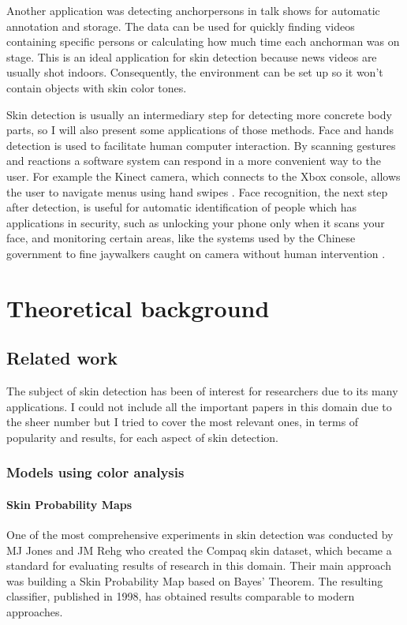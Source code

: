 \documentclass[12pt]{report}
\begin{document}
	Another application was detecting anchorpersons in talk shows \cite{anchor_person_detection} for automatic annotation and storage. The data can be used for quickly finding videos containing specific persons or calculating how much time each anchorman was on stage. This is an ideal application for skin detection because news videos are usually shot indoors. Consequently, the environment can be set up so it won't contain objects with skin color tones.
	
	Skin detection is usually an intermediary step for detecting more concrete body parts, so I will also present some applications of those methods. Face and hands detection is used to facilitate human computer interaction. By scanning gestures and reactions a software system can respond in a more convenient way to the user. For example the Kinect camera, which connects to the Xbox console,
	allows the user to navigate menus using hand swipes \cite{kinect_control}. Face recognition, the next step after detection, is useful for automatic identification of people \cite{detecting_faces_a_survey} which has applications in security, such as unlocking your phone only when it scans your face, and monitoring certain areas, like the systems used by the Chinese government to fine jaywalkers caught on camera without human intervention \cite{jaywalkers_china}.
	
	\chapter{Theoretical background}
	
	\section{Related work}
	The subject of skin detection has been of interest for researchers due to its many applications. I could not include all the important papers in this domain due to the sheer number but I tried to cover the most relevant ones, in terms of popularity and results, for each aspect of skin detection.
	
	\subsection{Models using color analysis}
	
	\subsubsection{Skin Probability Maps}
	One of the most comprehensive experiments in skin detection was conducted by MJ Jones and JM Rehg\cite{compaq} who created the Compaq skin dataset, which became a standard for evaluating results of research in this domain. Their main approach was building a Skin Probability Map based on Bayes' Theorem. The resulting classifier, published in 1998, has obtained results comparable to modern approaches.
	
\end{document}
